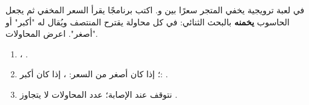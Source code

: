 \begin{statement}
في لعبة ترويجية يخفي المتجر سعرًا بين  و. اكتب برنامجًا يقرأ السعر المخفي ثم يجعل الحاسوب \textbf{يخمنه} بالبحث الثنائي: في كل محاولة يقترح المنتصف ويُقال له "أكبر" أو "أصغر". اعرض المحاولات.
\end{statement}
\begin{stepsbox}\begin{enumerate}
\item {}، .
\item {}؛ إذا كان أصغر من السعر: ، إذا كان أكبر: .
\item نتوقف عند الإصابة؛ عدد المحاولات لا يتجاوز .
\end{enumerate}\end{stepsbox}
